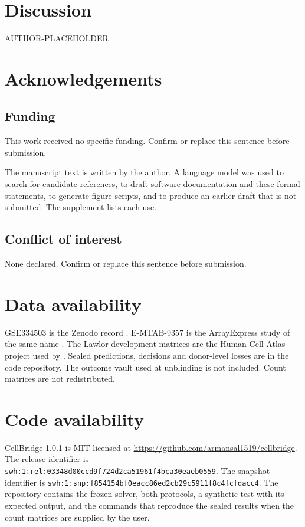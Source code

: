 \documentclass[unnumsec,webpdf,contemporary,large,namedate]{oup-authoring-template}
\begin{document}
\section{Discussion}
\label{sec:discussion}
AUTHOR-PLACEHOLDER

\section{Acknowledgements}
\subsection{Funding}
This work received no specific funding. Confirm or replace this sentence before submission.

The manuscript text is written by the author. A language model was used to search for candidate references, to draft software documentation and these formal statements, to generate figure scripts, and to produce an earlier draft that is not submitted. The supplement lists each use.

\subsection{Conflict of interest}
None declared. Confirm or replace this sentence before submission.

\section{Data availability}
GSE334503 is the Zenodo record \cite{king2026data}. E-MTAB-9357 is the ArrayExpress study of the same name \cite{emtab9357data}. The Lawlor development matrices are the Human Cell Atlas project used by \cite{lawlor2021data}. Sealed predictions, decisions and donor-level losses are in the code repository. The outcome vault used at unblinding is not included. Count matrices are not redistributed.

\section{Code availability}
CellBridge 1.0.1 is MIT-licensed at \url{https://github.com/armansal1519/cellbridge}. The release identifier is \texttt{swh:1:rel:03348d00ccd9f724d2ca51961f4bca30eaeb0559}. The snapshot identifier is \texttt{swh:1:snp:f854154bf0eacc86ed2cb29c5911f8c4fcfdacc4}. The repository contains the frozen solver, both protocols, a synthetic test with its expected output, and the commands that reproduce the sealed results when the count matrices are supplied by the user.



\end{document}
